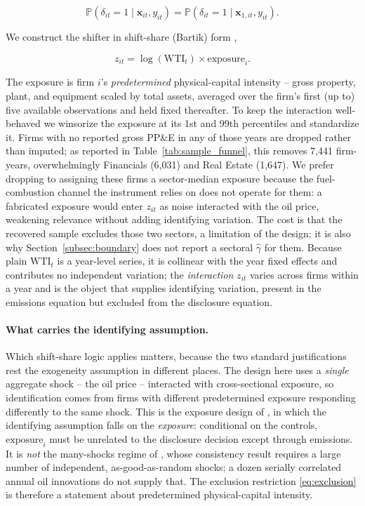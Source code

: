 \documentclass[a4paper,12pt]{article}
\newcommand{\citet}[1]{\textcite{#1}}
\newcommand{\citep}[1]{\parencite{#1}}
\begin{document}
\begin{equation}
\label{eq:exclusion}
\mathbb{P}(\delta_{it} = 1 \mid \mathbf{x}_{it}, y_{it}) = \mathbb{P}(\delta_{it} = 1 \mid \mathbf{x}_{1,it}, y_{it}).
\end{equation}

We construct the shifter in shift-share (Bartik) form \citep{goldsmithpinkham2020bartik, borusyak2022quasi}, 

\begin{equation}
    z_{it} = \log(\mathrm{WTI}_t) \times \mathrm{exposure}_i.
\end{equation}

The exposure is firm $i$'s \emph{predetermined} physical-capital intensity -- gross property, plant, and equipment scaled by total assets, averaged over the firm's first (up to) five available observations and held fixed thereafter. To keep the interaction well-behaved we winsorize the exposure at its 1st and 99th percentiles and standardize it. Firms with no reported gross PP\&E in any of those years are dropped rather than imputed; as reported in Table~\ref{tab:sample_funnel}, this removes 7{,}441 firm-years, overwhelmingly Financials (6{,}031) and Real Estate (1{,}647). We prefer dropping to assigning these firms a sector-median exposure because the fuel-combustion channel the instrument relies on does not operate for them: a fabricated exposure would enter $z_{it}$ as noise interacted with the oil price, weakening relevance without adding identifying variation. The cost is that the recovered sample excludes those two sectors, a limitation of the design; it is also why Section~\ref{subsec:boundary} does not report a sectoral $\hat\gamma$ for them. Because plain $\mathrm{WTI}_t$ is a year-level series, it is collinear with the year fixed effects and contributes no independent variation; the \emph{interaction} $z_{it}$ varies across firms within a year and is the object that supplies identifying variation, present in the emissions equation but excluded from the disclosure equation.

\paragraph{What carries the identifying assumption.} Which shift-share logic applies matters, because the two standard justifications rest the exogeneity assumption in different places. The design here uses a \emph{single} aggregate shock -- the oil price -- interacted with cross-sectional exposure, so identification comes from firms with different predetermined exposure responding differently to the same shock. This is the exposure design of \citet{goldsmithpinkham2020bartik}, in which the identifying assumption falls on the \emph{exposure}: conditional on the controls, $\mathrm{exposure}_i$ must be unrelated to the disclosure decision except through emissions. It is \emph{not} the many-shocks regime of \citet{borusyak2022quasi}, whose consistency result requires a large number of independent, as-good-as-random shocks; a dozen serially correlated annual oil innovations do not supply that. The exclusion restriction \eqref{eq:exclusion} is therefore a statement about predetermined physical-capital intensity.
\end{document}
